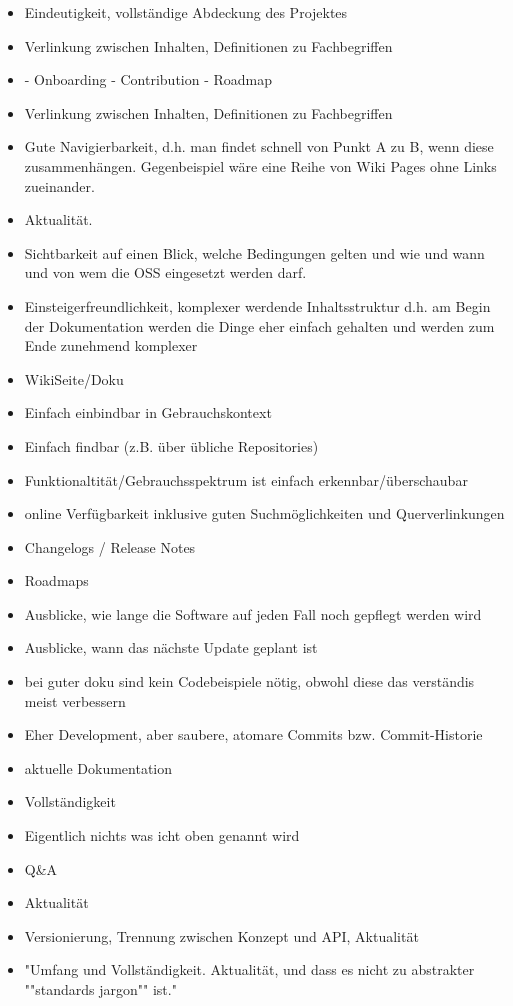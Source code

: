 \begin{multicols}{2}
\begin{itemize}
        \item Eindeutigkeit, vollständige Abdeckung des Projektes
        \item Verlinkung zwischen Inhalten, Definitionen zu Fachbegriffen
        \item - Onboarding
              - Contribution
              - Roadmap
        \item Verlinkung zwischen Inhalten, Definitionen zu Fachbegriffen
        \item Gute Navigierbarkeit, d.h. man findet schnell von Punkt A zu B, wenn diese zusammenhängen. Gegenbeispiel wäre eine Reihe von Wiki Pages ohne Links zueinander.
        \item Aktualität.
        \item Sichtbarkeit auf einen Blick, welche Bedingungen gelten und wie und wann und von wem die OSS eingesetzt werden darf.
        \item Einsteigerfreundlichkeit, komplexer werdende Inhaltsstruktur d.h. am Begin der Dokumentation werden die Dinge eher einfach gehalten und werden zum Ende zunehmend komplexer
        \item WikiSeite/Doku
        \item Einfach einbindbar in Gebrauchskontext
        \item Einfach findbar (z.B. über übliche Repositories)
        \item Funktionaltität/Gebrauchsspektrum ist einfach erkennbar/überschaubar
        \item online Verfügbarkeit inklusive guten Suchmöglichkeiten und Querverlinkungen
        \item Changelogs / Release Notes
        \item Roadmaps
        \item Ausblicke, wie lange die Software auf jeden Fall noch gepflegt werden wird
        \item Ausblicke, wann das nächste Update geplant ist
        \item bei guter doku sind kein Codebeispiele nötig, obwohl diese das verständis meist verbessern
        \item Eher Development, aber saubere, atomare Commits bzw. Commit-Historie
        \item aktuelle Dokumentation
        \item Vollständigkeit
        \item Eigentlich nichts was icht oben genannt wird
        \item Q\&A
        \item Aktualität
        \item Versionierung, Trennung zwischen Konzept und API, Aktualität
        \item "Umfang und Vollständigkeit. Aktualität, und dass es nicht zu abstrakter ""standards jargon"" ist."
    \end{itemize}
\end{multicols}



